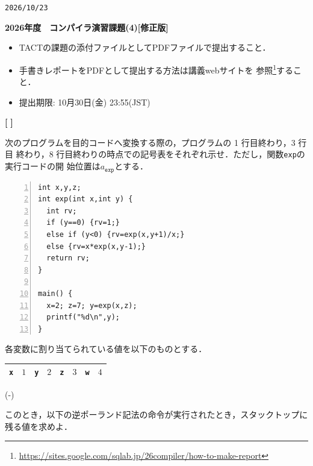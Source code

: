 \documentclass[dvipdfmx]{jarticle}
\newcounter{coffee}
\newcounter{bean}
\begin{document}
\begin{flushright}
\verb|2026/10/23|
\end{flushright}
\begin{center}{\bf\Large
  2026年度　コンパイラ演習課題(4)[修正版]
}\end{center}
\begin{itemize}
  \item TACTの課題の添付ファイルとしてPDFファイルで提出すること．
  \item 手書きレポートをPDFとして提出する方法は講義webサイトを
  参照\footnote{\url{https://sites.google.com/sqlab.jp/26compiler/how-to-make-report}}すること．
  \item 提出期限: 10月30日(金) 23:55(JST)
\end{itemize}

\begin{list}{{\bf [\,\,]}}{}
  \item 次のプログラムを目的コードへ変換する際の，プログラムの 1 行目終わり，3 行目
  終わり，8 行目終わりの時点での記号表をそれぞれ示せ．ただし，関数\texttt{exp}の実行コードの開
  始位置は$a_{\texttt{exp}}$とする．

  \begin{Verbatim}[numbers=left]
int x,y,z;
int exp(int x,int y) {
  int rv;
  if (y==0) {rv=1;}
  else if (y<0) {rv=exp(x,y+1)/x;}
  else {rv=x*exp(x,y-1);}
  return rv;
}

main() {
  x=2; z=7; y=exp(x,z);
  printf("%d\n",y);
}
  \end{Verbatim}
\item 各変数に割り当てられている値を以下のものとする．
\begin{center}
	\begin{tabularx}{.75\linewidth}{|X|X||X|X||X|X||X|X|}\hline
		\texttt{x} & $1$ & \texttt{y} & $2$ & \texttt{z} & $3$ & \texttt{w} & $4$\\\hline
	\end{tabularx}
\end{center}
\begin{list}{(-)}{}
  \item
このとき，以下の逆ポーランド記法の命令が実行されたとき，スタックトップに残る値を求めよ．


\end{list}
\end{list}
\end{document}
